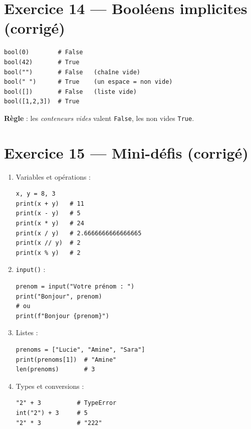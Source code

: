 \documentclass[11pt,a4paper]{article}
\begin{document}
\section*{Exercice 14 — Booléens implicites (corrigé)}
\begin{lstlisting}
bool(0)        # False
bool(42)       # True
bool("")       # False   (chaîne vide)
bool(" ")      # True    (un espace = non vide)
bool([])       # False   (liste vide)
bool([1,2,3])  # True
\end{lstlisting}
\textbf{Règle} : les \emph{conteneurs vides} valent \texttt{False}, les non vides \texttt{True}.

\section*{Exercice 15 — Mini-défis (corrigé)}
\begin{enumerate}
  \item Variables et opérations :
\begin{lstlisting}
x, y = 8, 3
print(x + y)   # 11
print(x - y)   # 5
print(x * y)   # 24
print(x / y)   # 2.6666666666666665
print(x // y)  # 2
print(x % y)   # 2
\end{lstlisting}

  \item \texttt{input()} :
\begin{lstlisting}
prenom = input("Votre prénom : ")
print("Bonjour", prenom)
# ou
print(f"Bonjour {prenom}")
\end{lstlisting}

  \item Listes :
\begin{lstlisting}
prenoms = ["Lucie", "Amine", "Sara"]
print(prenoms[1])  # "Amine"
len(prenoms)       # 3
\end{lstlisting}

  \item Types et conversions :
\begin{lstlisting}
"2" + 3          # TypeError
int("2") + 3     # 5
"2" * 3          # "222"
\end{lstlisting}
\end{enumerate}

\end{document}
